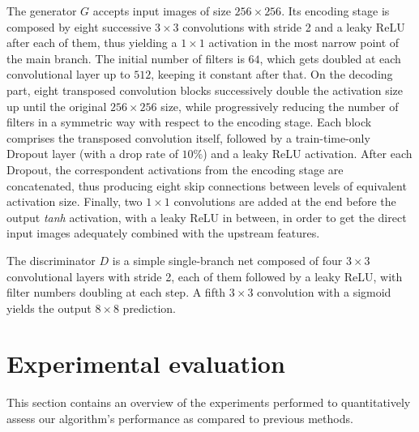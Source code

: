\documentclass[10pt,twocolumn,letterpaper]{article}
\begin{document}
The generator $G$ accepts input images of size $256\times 256$. Its encoding stage is composed by eight successive $3\times3$ convolutions with stride 2 and a leaky ReLU after each of them, thus yielding a $1\times1$ activation in the most narrow point of the main branch. The initial number of filters is $64$, which gets doubled at each convolutional layer up to $512$, keeping it constant after that. On the decoding part, eight transposed convolution blocks successively double the activation size up until the original $256\times256$ size, while progressively reducing the number of filters in a symmetric way with respect to the encoding stage. Each block comprises the transposed convolution itself, followed by a train-time-only Dropout layer (with a drop rate of $10\%$) and a leaky ReLU activation. After each Dropout, the correspondent activations from the encoding stage are concatenated, thus producing eight skip connections between levels of equivalent activation size. Finally, two $1\times1$ convolutions are added at the end before the output \emph{tanh} activation, with a leaky ReLU in between, in order to get the direct input images adequately combined with the upstream features.

The discriminator $D$ is a simple single-branch net composed of four $3\times3$ convolutional layers with stride 2, each of them followed by a leaky ReLU, with filter numbers doubling at each step. A fifth $3\times3$ convolution with a sigmoid yields the output $8\times8$ prediction.

\section{Experimental evaluation}
\label{sec:experimental_evaluation}

This section contains an overview of the experiments performed to quantitatively assess our algorithm's performance as compared to previous methods.

\end{document}
